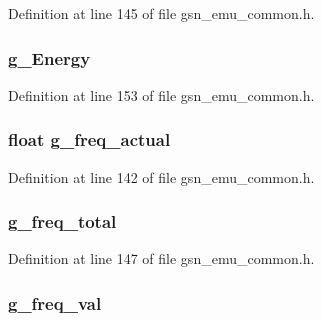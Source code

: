 Definition at line 145 of file gsn\_\-emu\_\-common.h.

\hypertarget{a00066_a6997f24ad04f1b390042fc1bfc45fdad}{
\subsubsection[{g\_\-Energy}]{ {\bf g\_\-Energy}}}
\label{a00066_a6997f24ad04f1b390042fc1bfc45fdad}


Definition at line 153 of file gsn\_\-emu\_\-common.h.

\hypertarget{a00066_a8932520e6108d066624f5a25af914002}{
\subsubsection[{g\_\-freq\_\-actual}]{\setlength{\rightskip}{0pt plus 5cm}float {\bf g\_\-freq\_\-actual}}}
\label{a00066_a8932520e6108d066624f5a25af914002}


Definition at line 142 of file gsn\_\-emu\_\-common.h.

\hypertarget{a00066_ad919f55ae9858631874a76b9068c6ef1}{
\subsubsection[{g\_\-freq\_\-total}]{ {\bf g\_\-freq\_\-total}}}
\label{a00066_ad919f55ae9858631874a76b9068c6ef1}


Definition at line 147 of file gsn\_\-emu\_\-common.h.

\hypertarget{a00066_a08dc72ba00172cb2b164be338d8c4136}{
\subsubsection[{g\_\-freq\_\-val}]{ {\bf g\_\-freq\_\-val}}}
\label{a00066_a08dc72ba00172cb2b164be338d8c4136}



